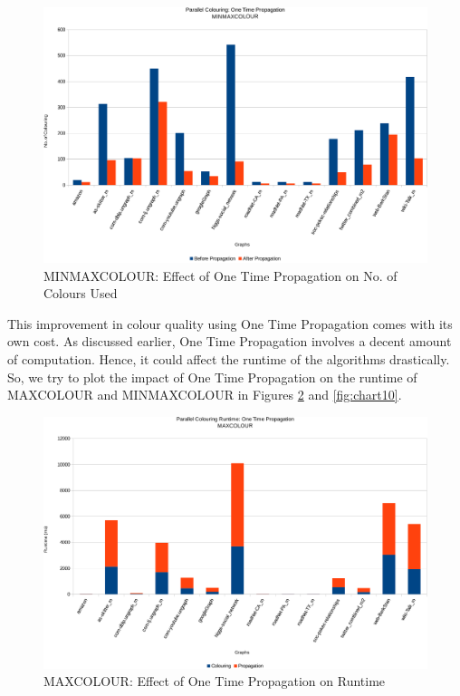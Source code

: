 \documentclass[MTech]{iitmdiss}
\begin{document}
\begin{figure}[h]
    \centering
    \includegraphics[width=\textwidth,keepaspectratio=true]{chartNewest8.pdf}
    \caption{
        MINMAXCOLOUR: Effect of One Time Propagation on No. of Colours Used
    }
    \label{fig:chart8}
\end{figure}

This improvement in colour quality using One Time Propagation comes with its own cost. As discussed earlier, One Time Propagation involves a decent amount of computation. Hence, it could affect the runtime of the algorithms drastically. So, we try to plot the impact of One Time Propagation on the runtime of MAXCOLOUR and MINMAXCOLOUR in Figures \ref{fig:chart9} and \ref{fig:chart10}. 

\begin{figure}[h]
    \centering
    \includegraphics[width=\textwidth,keepaspectratio=true]{chartNewest9.pdf}
    \caption{
        MAXCOLOUR: Effect of One Time Propagation on Runtime
    }
    \label{fig:chart9}
\end{figure}
\end{document}
